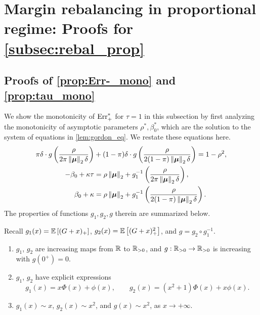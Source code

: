 \section{Margin rebalancing in proportional regime: Proofs for \cref{subsec:rebal_prop}}
\label{append_sec:mar_reb}

\subsection{Proofs of \cref{prop:Err-_mono} and \ref{prop:tau_mono}}


We show the monotonicity of $\mathrm{Err}_+^*$ for $\tau = 1$ in this subsection by first analyzing the monotonicity of asymptotic parameters $\rho^*, \beta_0^*$, which are the solution to the system of equations in \cref{lem:gordon_eq}. We restate these equations here.
\begin{subequations}
\begin{align}
    \label{eq:reb_sys_eq_rho}
        \pi \delta \cdot g \left( \frac{\rho}{2 \pi \left\|{\text{\boldmath $\mu$}}\right\|_2 \delta} \right) & + (1 - \pi) \delta \cdot g \left( \frac{\rho}{2(1 - \pi) \left\|{\text{\boldmath $\mu$}}\right\|_2 \delta} \right) = 1 - \rho^2, \\
    \label{eq:reb_sys_eq_bk1}
    - \beta_0 + \kappa \tau & = \rho \left\|{\text{\boldmath $\mu$}}\right\|_2 + g_1^{-1} \left( \frac{\rho}{2 \pi \left\|{\text{\boldmath $\mu$}}\right\|_2 \delta} \right), \\
    \label{eq:reb_sys_eq_bk2}
	\beta_0 + \kappa & = \rho \left\|{\text{\boldmath $\mu$}}\right\|_2 + g_1^{-1} \left( \frac{\rho}{2 (1 - \pi) \left\|{\text{\boldmath $\mu$}}\right\|_2 \delta} \right).
\end{align}
\end{subequations}
The properties of functions $g_1, g_2, g$ therein are summarized below.
\begin{lem}\label{lem:g1_g2_g} 
Recall $g_1 (x) = \mathbb{E} \left[ (G + x)_+ \right]$, $g_2 (x) = \mathbb{E} \left[ (G + x)_+^2 \right]$, and $g = g_2 \circ g_1^{-1}$.
\begin{enumerate}[label=(\alph*)]
    \item $g_1$, $g_2$ are increasing maps from $\mathbb{R}$ to $\mathbb{R}_{> 0}$, and $g: \mathbb{R}_{> 0} \to \mathbb{R}_{> 0}$ is increasing with $g(0^+) = 0$.  
    \item $g_1$, $g_2$ have explicit expressions
    \begin{equation*}
        g_1(x) = x \Phi(x) + \phi(x), \qquad g_2(x) = (x^2+1)\Phi(x) + x\phi(x). 
    \end{equation*}
    \item \label{lem:g1_g2_g_asymp} 
    $g_1(x) \sim x$, $g_2(x) \sim x^2$, and $g(x) \sim x^2$, as $x \to +\infty$.
\end{enumerate}
\end{lem}



